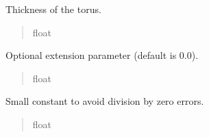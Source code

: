 \documentclass[letterpaper,10pt,english]{sphinxmanual}
\begin{document}
\begin{fulllineitems}

\begin{fulllineitems}
\label{\detokenize{src:src.Torus.Torus.thickness}}
\pysigstartsignatures
{}
\pysigstopsignatures
\sphinxAtStartPar
Thickness of the torus.
\begin{quote}\begin{description}
\sphinxAtStartPar
float

\end{description}\end{quote}

\end{fulllineitems}


\begin{fulllineitems}
\label{\detokenize{src:src.Torus.Torus.extension}}
\pysigstartsignatures
{}
\pysigstopsignatures
\sphinxAtStartPar
Optional extension parameter (default is 0.0).
\begin{quote}\begin{description}
\sphinxAtStartPar
float

\end{description}\end{quote}

\end{fulllineitems}


\begin{fulllineitems}
\label{\detokenize{src:src.Torus.Torus.eps}}
\pysigstartsignatures
{}
\pysigstopsignatures
\sphinxAtStartPar
Small constant to avoid division by zero errors.
\begin{quote}\begin{description}
\sphinxAtStartPar
float

\end{description}\end{quote}

\end{fulllineitems}


\end{fulllineitems}
\end{document}
